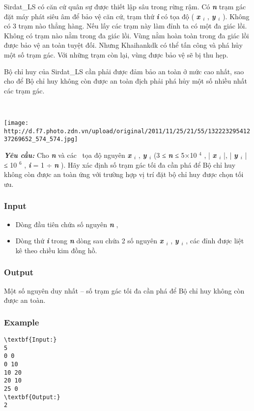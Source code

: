 

Sirdat\_LS có căn cứ quân sự được thiết lập sâu trong rừng rậm. Có \textbf{\emph{ n }} trạm gác đặt máy phát siêu âm để bảo vệ căn cứ, trạm thứ \textbf{\emph{ i }} có tọa độ ( \textbf{\emph{ x $_ i $}} , \textbf{\emph{ y $_ i $}} ). Không có 3 trạm nào thẳng hàng. Nếu lấy các trạm này làm đỉnh ta có một đa giác lồi. Không có trạm nào nằm trong đa giác lồi. Vùng nằm hoàn toàn trong đa giác lồi được bảo vệ an toàn tuyệt đối. Nhưng Khaihankdk có thể tấn công và phá hủy một số trạm gác. Với những trạm còn lại, vùng được bảo vệ sẽ bị thu hẹp.

Bộ chỉ huy của Sirdat\_LS cần phải được đảm bảo an toàn ở mức cao nhất, sao cho để Bộ chỉ huy không còn được an toàn địch phải phá hủy một số nhiều nhất các trạm gác.

 


\texttt{[image: http://d.f7.photo.zdn.vn/upload/original/2011/11/25/21/55/13222329541237269652\_574\_574.jpg]}

\textbf{\emph{Yêu cầu: }} Cho \textbf{\emph{ n }} và các  tọa độ nguyên \textbf{\emph{ x $_ i $}} , \textbf{\emph{ y $_ i $}} (3 ≤ \textbf{\emph{ n }} ≤ 5×10 $^ 4 $ , | \textbf{\emph{ x $_ i $}} |, | \textbf{\emph{ y $_ i $}} | ≤ 10 $^ 6 $ , \textbf{\emph{ i }} = 1 ÷ \textbf{\emph{ n }} ). Hãy xác định số trạm gác tối đa cần phá để Bộ chỉ huy không còn được an toàn ứng với trường hợp vị trí đặt bộ chỉ huy được chọn tối ưu.

\subsubsection{Input}
\begin{itemize}
	\item Dòng đầu tiên chứa số nguyên \textbf{\emph{ n }} ,
	\item Dòng thứ \textbf{\emph{ i }} trong \textbf{\emph{ n }} dòng sau chứa 2 số nguyên \textbf{\emph{ x $_ i $}} , \textbf{\emph{ y $_ i $}} , các đỉnh được liệt kê theo chiều kim đồng hồ.
\end{itemize}

\subsubsection{Output}

Một số nguyên duy nhất – số trạm gác tối đa cần phá để Bộ chỉ huy không còn được an toàn.

\subsubsection{Example}
\begin{verbatim}
\textbf{Input:}
5
0 0
0 10
10 20
20 10
25 0
\textbf{Output:}
2
\end{verbatim}
